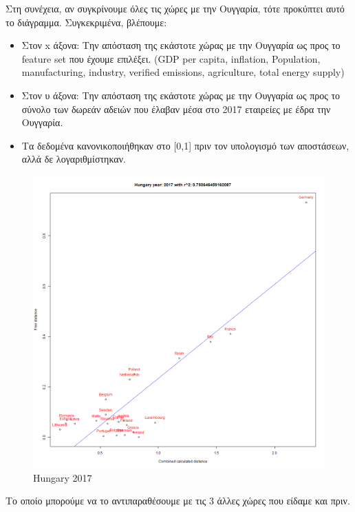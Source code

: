 \documentclass[a4paper,twoside,10pt]{article}
\begin{document}
	Στη συνέχεια, αν συγκρίνουμε όλες τις χώρες με την Ουγγαρία, τότε προκύπτει αυτό το διάγραμμα. Συγκεκριμένα, βλέπουμε:
	\begin{itemize}
		\item Στον x άξονα: Την απόσταση της εκάστοτε χώρας με την Ουγγαρία ως προς το feature set που έχουμε επιλέξει. (GDP per capita, inflation, Population, manufacturing, industry, verified emissions, agriculture, total energy supply)
		\item Στον υ άξονα: Την απόσταση της εκάστοτε χώρας με την Ουγγαρία ως προς το σύνολο των δωρεάν αδειών που έλαβαν μέσα στο 2017 εταιρείες με έδρα την Ουγγαρία.
		\item Τα δεδομένα κανονικοποιήθηκαν στο [0,1] πριν τον υπολογισμό των αποστάσεων, αλλά δε λογαριθμίστηκαν. 
	\end{itemize}
	\begin{figure}[H]
		\centering
		\includegraphics[width = \textwidth]{images/Hungary 2017.png}
		\caption{Hungary 2017}
		\label{fig:/Hungary_2017}
	\end{figure}
	\newpage
	Το οποίο μπορούμε να το αντιπαραθέσουμε με τις 3 άλλες χώρες που είδαμε και πριν.
	
\end{document}
